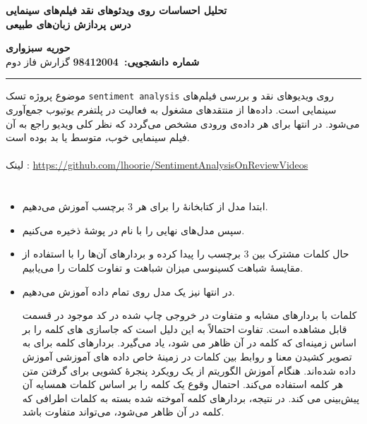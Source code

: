 
\def \Subject {تحلیل احساسات روی ویدئوهای نقد فیلم‌‌های سینمایی}
\def \Course {درس پردازش زبان‌های طبیعی}
\def \Author {حوریه سبزواری}
\def \Report {گزارش فاز دوم}
\def \StudentNumber {98412004}

\begin{center}
\vspace{.4cm}
{\bf {\huge \Subject}}\\
{\bf \Large \Course}
\vspace{.2cm}
\end{center}
{\bf \Author }  \\
{\bf شماره دانشجویی:\ \StudentNumber}
\hspace{\fill} 
{\Large \Report} \\
\hrule
\vspace{0.8cm}

\clearpage

\par
موضوع پروژه تسک \texttt{sentiment analysis} روی ویدیو‌های نقد و بررسی فیلم‌های سینمایی است. داده‌ها از منتقدهای مشغول به فعالیت در پلتفرم یوتیوب جمع‌آوری می‌شود. در انتها برای هر داده‌ی ورودی مشخص می‌گردد که نظر کلی ویدیو راجع به آن فیلم سینمایی خوب، متوسط یا بد بوده است.\\ \\
لینک : \href{https://github.com/lhoorie/SentimentAnalysisOnReviewVideos}{https://github.com/lhoorie/SentimentAnalysisOnReviewVideos}

\section{}
\begin{itemize}
\item ابتدا مدل  از کتابخانۀ  را برای هر 3 برچسب آموزش می‌دهیم.
\item سپس مدل‌های نهایی را با نام  در پوشۀ  ذخیره می‌کنیم.
\item حال کلمات مشترک بین 3 برچسب را پیدا کرده و بردارهای آن‌ها را با استفاده از مقایسۀ شباهت کسینوسی میزان شباهت و تفاوت کلمات را می‌یابیم.
\item در انتها نیز یک مدل  روی تمام داده آموزش می‌دهیم.

کلمات با بردارهای مشابه و متفاوت در خروجی چاپ شده در کد موجود در  قسمت  قابل مشاهده است. تفاوت احتمالاً به این دلیل است که جاسازی های کلمه را بر اساس زمینه‌ای که کلمه در آن ظاهر می شود، یاد می‌گیرد. بردارهای کلمه برای به تصویر کشیدن معنا و روابط بین کلمات در زمینۀ خاص داده های آموزشی آموزش داده شده‌اند.
هنگام آموزش الگوریتم از یک رویکرد پنجرۀ کشویی برای گرفتن متن هر کلمه استفاده می‌کند. احتمال وقوع یک کلمه را بر اساس کلمات همسایه آن پیش‌بینی می کند. در نتیجه، بردارهای کلمه آموخته شده بسته به کلمات اطرافی که کلمه در آن ظاهر می‌شود، می‌تواند متفاوت باشد.
\end{itemize}

